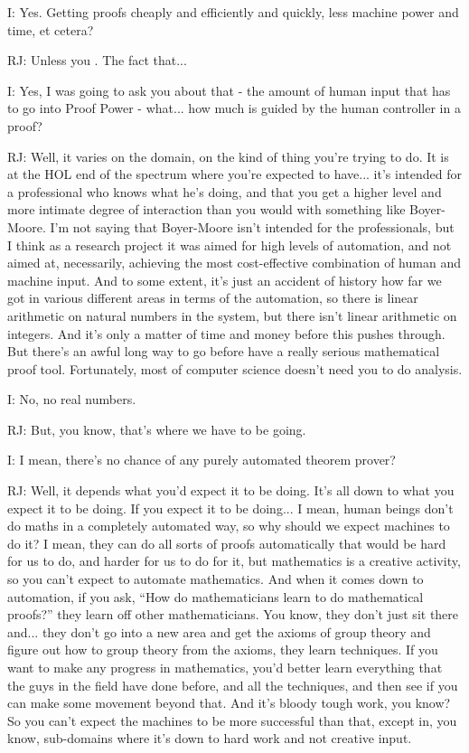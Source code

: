 \documentclass[10pt,titlepage]{book}
\begin{document}
I: Yes. Getting proofs cheaply and efficiently and quickly, less machine power and time, et cetera?

RJ: Unless you	. The fact that...

I: Yes, I was going to ask you about that - the amount of human input that has to go into Proof Power - what... how much is guided by the human controller in a proof?

RJ: Well, it varies on the domain, on the kind of thing you're trying to do. It is at the HOL end of the spectrum where you're expected to have... it's intended for a professional who knows what he's doing, and that you get a higher level and more intimate degree of interaction than you would with something like Boyer-Moore. I'm not saying that Boyer-Moore isn't intended for the professionals, but I think as a research project it was aimed for high levels of automation, and not aimed at, necessarily, achieving the most cost-effective combination of human and machine input. And to some extent, it's just an accident of history how far we got in various different areas in terms of the automation, so there is linear arithmetic on natural numbers in the system, but there isn't linear arithmetic on integers. And it's only a matter of time and money before this pushes through. But there's an awful long way to go before have a really serious mathematical proof tool. Fortunately, most of computer science doesn't need you to do analysis.

I: No, no real numbers.

RJ: But, you know, that's where we have to be going.

I: I mean, there's no chance of any purely automated theorem prover?

RJ: Well, it depends what you'd expect it to be doing. It's all down to what you expect it to be doing. If you expect it to be doing... I mean, human beings don't do maths in a completely automated way, so why should we expect machines to do it? I mean, they can do all sorts of proofs automatically that would be hard for us to do, and harder for us to do for	it, but mathematics is a creative activity, so you can't expect to automate mathematics. And when it comes down to automation, if you ask, ``How do mathematicians learn to do mathematical proofs?'' they learn off other mathematicians. You know, they don't just sit there and... they don't go into a new area and get the axioms of group theory and figure out how to group theory from the axioms, they learn techniques. If you want to make any progress in mathematics, you'd better learn everything that the guys in the field have done before, and all the techniques, and then see if you can make some movement beyond that. And it's bloody tough work, you know? So you can't expect the machines to be more successful than that, except in, you know, sub-domains where it's down to hard work and not creative input.
\end{document}

